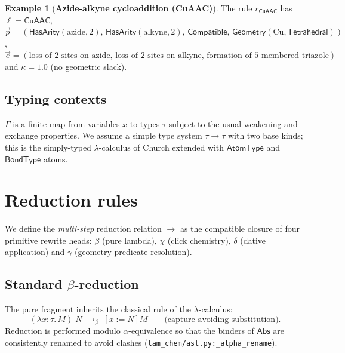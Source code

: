 \documentclass{article}
\theoremstyle{definition}
\newtheorem{example}[theorem]{Example}
\newcommand{\subst}[3]{[#1:=#2]#3}
\newcommand{\stepsto}{\longrightarrow}
\newcommand{\stepstoBeta}{\longrightarrow_{\beta}}
\begin{document}
\begin{example}[\textbf{Azide-alkyne cycloaddition (CuAAC)}]
The rule $r_{\mathsf{CuAAC}}$ has
$\ell = \mathsf{CuAAC}$,
$\vec p = (\mathsf{HasArity}(\text{azide},2),\,
          \mathsf{HasArity}(\text{alkyne},2),\,
          \mathsf{Compatible},\,
          \mathsf{Geometry}(\text{Cu},\mathsf{Tetrahedral}))$,
$\vec e = (\text{loss of 2 sites on azide},\, \text{loss of 2 sites on alkyne},\,
           \text{formation of 5-membered triazole})$
and $\kappa = 1.0$ (no geometric slack).
\end{example}

\subsection{Typing contexts}
$\Gamma$ is a finite map from variables $x$ to types $\tau$ subject to the
usual weakening and exchange properties. We assume a simple type system
$\tau \to \tau$ with two base kinds; this is the simply-typed $\lambda$-calculus
of Church extended with $\mathsf{AtomType}$ and $\mathsf{BondType}$ atoms.

\section{Reduction rules}
\label{sec:reduction}
We define the \emph{multi-step} reduction relation $\stepsto$ as the
compatible closure of four primitive rewrite heads: $\beta$ (pure lambda),
$\chi$ (click chemistry), $\delta$ (dative application) and $\gamma$
(geometry predicate resolution).

\subsection{Standard $\beta$-reduction}
The pure fragment inherits the classical rule of the $\lambda$-calculus:
\begin{equation*}
  (\lambda x{:}\tau.\, M)\; N \;\stepstoBeta\; \subst{x}{N}{M}
  \qquad\text{(capture-avoiding substitution)}.
\end{equation*}
Reduction is performed modulo $\alpha$-equivalence so that the binders of
$\mathsf{Abs}$ are consistently renamed to avoid clashes
(\texttt{lam\_chem/ast.py:\_alpha\_rename}).
\end{document}
